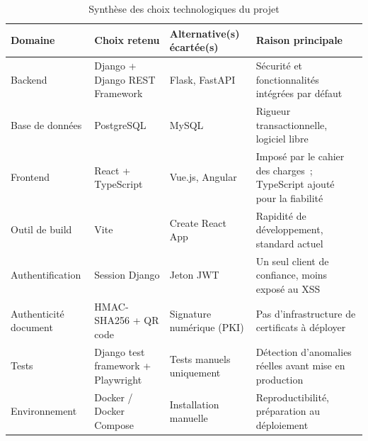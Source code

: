 \begin{table}[htbp]
    \centering
    \small
    \begin{tabular}{|p{2.8cm}|p{3.6cm}|p{3.6cm}|p{4cm}|}
        \hline
        \textbf{Domaine} & \textbf{Choix retenu} & \textbf{Alternative(s) écartée(s)} & \textbf{Raison principale} \\
        \hline
        Backend & Django + Django REST Framework & Flask, FastAPI & Sécurité et fonctionnalités intégrées par défaut \\
        \hline
        Base de données & PostgreSQL & MySQL & Rigueur transactionnelle, logiciel libre \\
        \hline
        Frontend & React + TypeScript & Vue.js, Angular & Imposé par le cahier des charges~; TypeScript ajouté pour la fiabilité \\
        \hline
        Outil de build & Vite & Create React App & Rapidité de développement, standard actuel \\
        \hline
        Authentification & Session Django & Jeton JWT & Un seul client de confiance, moins exposé au XSS \\
        \hline
        Authenticité document & HMAC-SHA256 + QR code & Signature numérique (PKI) & Pas d'infrastructure de certificats à déployer \\
        \hline
        Tests & Django test framework + Playwright & Tests manuels uniquement & Détection d'anomalies réelles avant mise en production \\
        \hline
        Environnement & Docker / Docker Compose & Installation manuelle & Reproductibilité, préparation au déploiement \\
        \hline
    \end{tabular}
    \caption{Synthèse des choix technologiques du projet}
    \label{tab:choix-technologiques}
\end{table}
